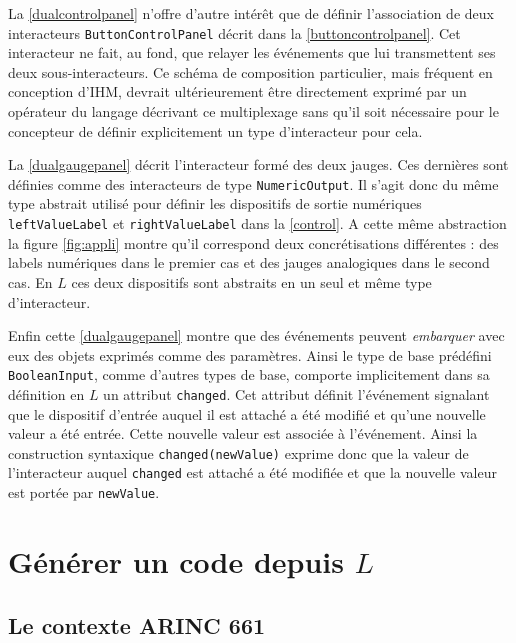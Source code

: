 \documentclass{ihm}
\begin{document}
La \autoref{dualcontrolpanel}  n'offre d'autre intérêt que  de définir
l'association  de   deux  interacteurs  \lstinline$ButtonControlPanel$
décrit dans la \autoref{buttoncontrolpanel}.  Cet interacteur ne fait,
au  fond, que  relayer les  événements que  lui transmettent  ses deux
sous-interacteurs.   Ce   schéma  de  composition   particulier,  mais
fréquent en conception d'IHM,  devrait ultérieurement être directement
exprimé par  un opérateur  du langage  décrivant ce  multiplexage sans
qu'il soit nécessaire  pour le concepteur de  définir explicitement un
type d'interacteur pour cela.

La  \autoref{dualgaugepanel}  décrit   l'interacteur  formé  des  deux
jauges. Ces  dernières sont  définies comme  des interacteurs  de type
\lstinline$NumericOutput$.   Il  s'agit  donc du  même  type  abstrait
utilisé   pour   définir   les  dispositifs   de   sortie   numériques
\lstinline$leftValueLabel$  et   \lstinline$rightValueLabel$  dans  la
\autoref{control}. A cette même  abstraction la figure \ref{fig:appli}
montre qu'il correspond deux  concrétisations différentes : des labels
numériques  dans le  premier cas  et  des jauges  analogiques dans  le
second cas. En  $L$ ces deux dispositifs sont abstraits  en un seul et
même type d'interacteur. 

Enfin cette \autoref{dualgaugepanel} montre que des événements peuvent
\emph{embarquer}   avec   eux   des    objets   exprimés   comme   des
paramètres. Ainsi le type  de base prédéfini \lstinline$BooleanInput$,
comme  d'autres   types  de  base,  comporte   implicitement  dans  sa
définition  en  $L$  un attribut  \lstinline$changed$.   Cet  attribut
définit l'événement signalant que le dispositif d'entrée auquel il est
attaché a été  modifié et qu'une nouvelle valeur a  été entrée.  Cette
nouvelle  valeur est  associée à  l'événement.  Ainsi  la construction
syntaxique \lstinline$changed(newValue)$ exprime donc que la valeur de
l'interacteur auquel \lstinline$changed$ est attaché a été modifiée et
que la nouvelle valeur est portée par \lstinline$newValue$.

\section{Générer un code depuis $L$}

\subsection{Le contexte ARINC 661}
\end{document}
